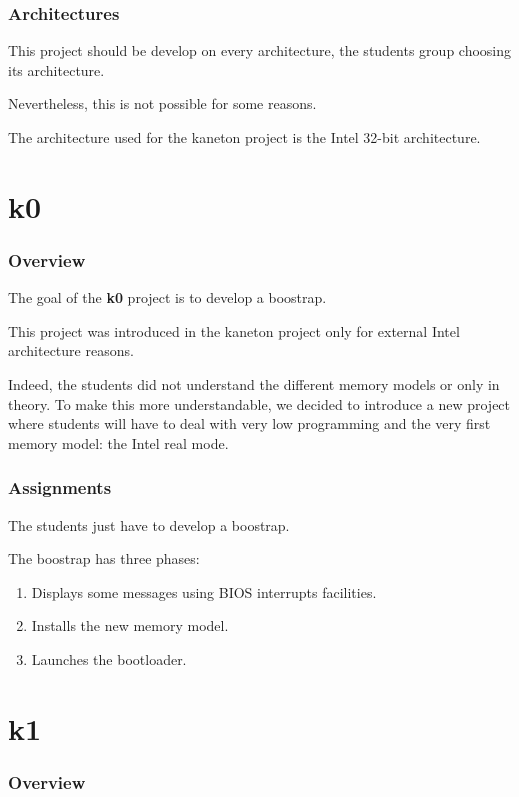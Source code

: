 
\begin{frame}
  \frametitle{Architectures}

  This project should be develop on every architecture, the students group
  choosing its architecture.

  \nl

  Nevertheless, this is not possible for some reasons.

  \nl

  The architecture used for the kaneton project is the Intel 32-bit
  architecture.
\end{frame}

%
%

\section{k0}


\begin{frame}
  \frametitle{Overview}

  The goal of the \textbf{k0} project is to develop a boostrap.

  \nl

  This project was introduced in the kaneton project only for
  external Intel architecture reasons.

  \nl

  Indeed, the students did not understand the different memory models
  or only in theory. To make this more understandable, we decided to
  introduce a new project where students will have to deal with very
  low programming and the very first memory model: the Intel real mode.
\end{frame}


\begin{frame}
  \frametitle{Assignments}

  The students just have to develop a boostrap.

  \nl

  The boostrap has three phases:

  \begin{enumerate}[<+->]
    \item
      Displays some messages using BIOS interrupts facilities.
    \item
      Installs the new memory model.
    \item
      Launches the bootloader.
  \end{enumerate}
\end{frame}

%
%

\section{k1}


\begin{frame}
  \frametitle{Overview}

  
\end{frame}


